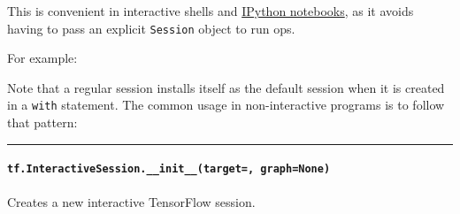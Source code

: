 This is convenient in interactive shells and
\href{http://ipython.org}{IPython notebooks}, as it avoids having to
pass an explicit \texttt{Session} object to run ops.

For example:

\begin{Shaded}
\begin{Highlighting}[]
\OperatorTok{=} 
\OperatorTok{=} \NormalTok{)}
\OperatorTok{=} \NormalTok{)}
\OperatorTok{=} \OperatorTok{*} 
 \NormalTok{()}
\end{Highlighting}
\end{Shaded}

Note that a regular session installs itself as the default session when
it is created in a \texttt{with} statement. The common usage in
non-interactive programs is to follow that pattern:

\begin{Shaded}
\begin{Highlighting}[]
\OperatorTok{=} \NormalTok{)}
\OperatorTok{=} \NormalTok{)}
\OperatorTok{=} \OperatorTok{*} 
 
   \NormalTok{()}
\end{Highlighting}
\end{Shaded}

\begin{center}\rule{0.5\linewidth}{\linethickness}\end{center}

\paragraph{\texorpdfstring{\texttt{tf.InteractiveSession.\_\_init\_\_(target=\textquotesingle{}\textquotesingle{},\ graph=None)}
}{tf.InteractiveSession.\_\_init\_\_(target='', graph=None) }}\label{tf.interactivesession.ux5fux5finitux5fux5ftarget-graphnone}

Creates a new interactive TensorFlow session.


